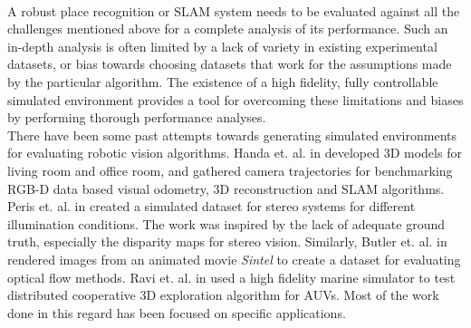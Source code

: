 \\
A robust place recognition or SLAM system needs to be evaluated against all the challenges mentioned above for a complete analysis of its performance. Such an in-depth analysis is often limited by a lack of variety in existing experimental datasets, or bias towards choosing datasets that work for the assumptions made by the particular algorithm. The existence of a high fidelity, fully controllable simulated environment provides a tool for overcoming these limitations and biases by performing thorough performance analyses.
\\
There have been some past attempts towards generating simulated environments for evaluating robotic vision algorithms. Handa et. al. in \cite{handa2014benchmark} developed 3D models for living room and office room, and gathered camera trajectories for benchmarking RGB-D data based visual odometry, 3D reconstruction and SLAM algorithms. Peris et. al. in \cite{peris2012towards} created a simulated dataset for stereo systems for different illumination conditions. The work was inspired by the lack of adequate ground truth, especially the disparity maps for stereo vision. Similarly, Butler et. al. in \cite{butler2012naturalistic} rendered images from an animated movie \emph{Sintel} to create a dataset for evaluating optical flow methods. Ravi et. al. in \cite{rathnam2013initial} used a high fidelity marine simulator to test distributed cooperative 3D exploration algorithm for AUVs. Most of the work done in this regard has been focused on specific applications.